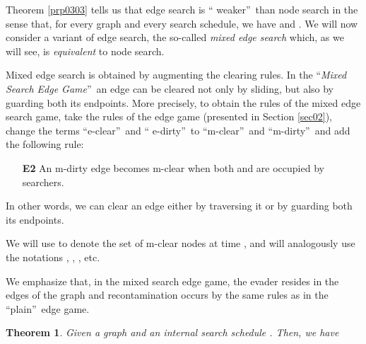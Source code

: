 \documentclass[11pt]{article}\usepackage{amsmath}
\newtheorem{theorem}{Theorem}[section]
\begin{document}
\label{secB}

Theorem \ref{prp0303} tells us that edge search is \textquotedblleft
weaker\textquotedblright\ than node search in the sense that, for every graph
and every search schedule, we have  and . We will now consider a variant of edge search,
the so-called \emph{mixed edge search }which, as we will see, is
\emph{equivalent} to node search.

Mixed edge search is obtained by augmenting the clearing rules. In the
\textquotedblleft\emph{Mixed Search Edge Game}\textquotedblright\ an edge can
be cleared not only by sliding, but also by guarding both its endpoints. More
precisely, to obtain the rules of the mixed edge search game, take the rules
of the edge game (presented in Section \ref{sec02}), change the terms
\textquotedblleft e-clear\textquotedblright\ and \textquotedblleft
e-dirty\textquotedblright\ to \textquotedblleft m-clear\textquotedblright\ and
\textquotedblleft m-dirty\textquotedblright\ and add the following rule:

\begin{enumerate}
\item[\textbf{{E2}}] An m-dirty edge  becomes m-clear when both
 and  are occupied by searchers.
\end{enumerate}

In other words, we can clear an edge either by traversing it or by guarding
both its endpoints.

We will use  to denote the set of m-clear nodes
at time , and will analogously use the notations , , ,
 etc.

We emphasize that, in the mixed search edge game, the evader resides in the
edges of the graph and recontamination occurs by the same rules as in the
\textquotedblleft plain\textquotedblright\ edge game.

\begin{theorem}
\label{prpA01}Given a graph  and an internal search schedule
. Then, we have


\end{theorem}
\end{document}
